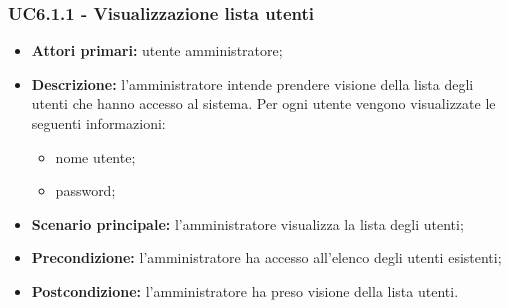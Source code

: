 \subsubsection{UC6.1.1 - Visualizzazione lista utenti}
\begin{itemize}
	\item \textbf{Attori primari:} utente amministratore;
	\item \textbf{Descrizione:} l'amministratore intende prendere visione della lista degli utenti che hanno accesso al sistema. Per ogni utente vengono visualizzate le seguenti informazioni:
		\begin{itemize}
			\item nome utente;
			\item password;
		\end{itemize}
	\item \textbf{Scenario principale:} l'amministratore visualizza la lista degli utenti;
	\item \textbf{Precondizione:} l'amministratore ha accesso all'elenco degli utenti esistenti;
	\item \textbf{Postcondizione:} l'amministratore ha preso visione della lista utenti.
\end{itemize}

